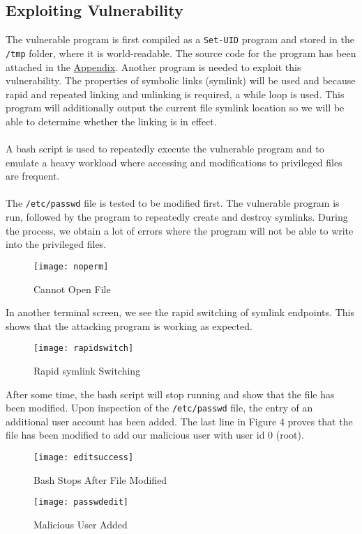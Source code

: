\documentclass[a4paper,12pt]{article}
\begin{document}
\subsection{Exploiting Vulnerability}
The vulnerable program is first compiled as a \texttt{Set-UID} program and stored in the \texttt{/tmp} folder, where it is world-readable. The source code for the program has been attached in the \hyperref[Appsec:3.2]{Appendix}. Another program is needed to exploit this vulnerability. The properties of symbolic links (symlink) will be used and because rapid and repeated linking and unlinking is required, a while loop is used. This program will additionally output the current file symlink location so we will be able to determine whether the linking is in effect.\\\\A bash script is used to repeatedly execute the vulnerable program and to emulate a heavy workload where accessing and modifications to privileged files are frequent.\\\\The \texttt{/etc/passwd} file is tested to be modified first. The vulnerable program is run, followed by the program to repeatedly create and destroy symlinks. During the process, we obtain a lot of errors where the program will not be able to write into the privileged files.
\begin{figure}[H]
	\centering
	\texttt{[image: noperm]}
	\caption{Cannot Open File}
	\label{fig:noperm}
\end{figure}
\noindent In another terminal screen, we see the rapid switching of symlink endpoints. This shows that the attacking program is working as expected.
\begin{figure}[H]
	\centering
	\texttt{[image: rapidswitch]}
	\caption{Rapid symlink Switching}
	\label{fig:rapidswitch}
\end{figure}
\noindent After some time, the bash script will stop running and show that the file has been modified. Upon inspection of the \texttt{/etc/passwd} file, the entry of an additional user account has been added. The last line in Figure 4 proves that the file has been modified to add our malicious user with user id 0 (root).
\begin{figure}[H]
	\centering
	\texttt{[image: editsuccess]}
	\caption{Bash Stops After File Modified}
	\label{fig:editsuccess}
\end{figure}
\begin{figure}[H]
	\centering
	\texttt{[image: passwdedit]}
	\caption{Malicious User Added}
	\label{fig:passwdedit}
\end{figure}
\end{document}
